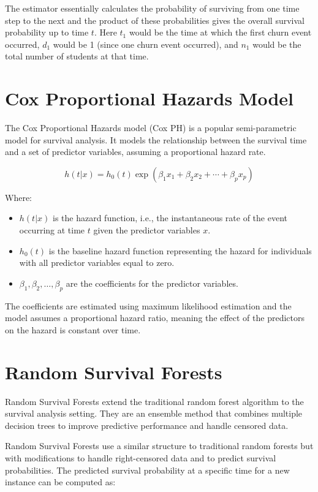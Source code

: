 \documentclass[12pt]{report}
\begin{document}
The estimator essentially calculates the probability of surviving from one time step to the next and the product of these probabilities gives the overall survival probability up to time \( t \). Here \( t_1 \) would be the time at which the first churn event occurred, \( d_1 \) would be 1 (since one churn event occurred), and \( n_1 \) would be the total number of students at that time.

\section{Cox Proportional Hazards Model}
The Cox Proportional Hazards model (Cox PH) is a popular semi-parametric model for survival analysis. It models the relationship between the survival time and a set of predictor variables, assuming a proportional hazard rate.

\[
h(t|x) = h_0(t) \exp(\beta_1 x_1 + \beta_2 x_2 + \cdots + \beta_p x_p)
\]

Where:
\begin{itemize}
    \item \( h(t|x) \) is the hazard function, i.e., the instantaneous rate of the event occurring at time \( t \) given the predictor variables \( x \).
    \item \( h_0(t) \) is the baseline hazard function representing the hazard for individuals with all predictor variables equal to zero.
    \item \( \beta_1, \beta_2, \ldots, \beta_p \) are the coefficients for the predictor variables.
\end{itemize}

The coefficients are estimated using maximum likelihood estimation and the model assumes a proportional hazard ratio, meaning the effect of the predictors on the hazard is constant over time.

\section{Random Survival Forests}
Random Survival Forests extend the traditional random forest algorithm to the survival analysis setting. They are an ensemble method that combines multiple decision trees to improve predictive performance and handle censored data.

Random Survival Forests use a similar structure to traditional random forests but with modifications to handle right-censored data and to predict survival probabilities. The predicted survival probability at a specific time for a new instance can be computed as:
\end{document}
